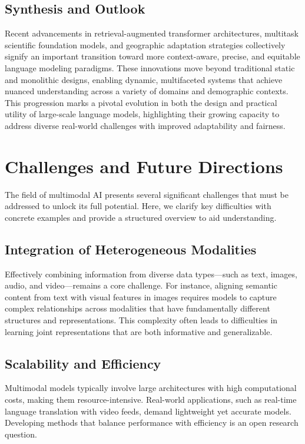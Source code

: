 \documentclass[sigconf]{acmart}
\begin{document}
\subsection{Synthesis and Outlook}

Recent advancements in retrieval-augmented transformer architectures, multitask scientific foundation models, and geographic adaptation strategies collectively signify an important transition toward more context-aware, precise, and equitable language modeling paradigms. These innovations move beyond traditional static and monolithic designs, enabling dynamic, multifaceted systems that achieve nuanced understanding across a variety of domains and demographic contexts. This progression marks a pivotal evolution in both the design and practical utility of large-scale language models, highlighting their growing capacity to address diverse real-world challenges with improved adaptability and fairness.

\section{Challenges and Future Directions}

The field of multimodal AI presents several significant challenges that must be addressed to unlock its full potential. Here, we clarify key difficulties with concrete examples and provide a structured overview to aid understanding.

\subsection{Integration of Heterogeneous Modalities}
Effectively combining information from diverse data types—such as text, images, audio, and video—remains a core challenge. For instance, aligning semantic content from text with visual features in images requires models to capture complex relationships across modalities that have fundamentally different structures and representations. This complexity often leads to difficulties in learning joint representations that are both informative and generalizable.

\subsection{Scalability and Efficiency}
Multimodal models typically involve large architectures with high computational costs, making them resource-intensive. Real-world applications, such as real-time language translation with video feeds, demand lightweight yet accurate models. Developing methods that balance performance with efficiency is an open research question.
\end{document}
